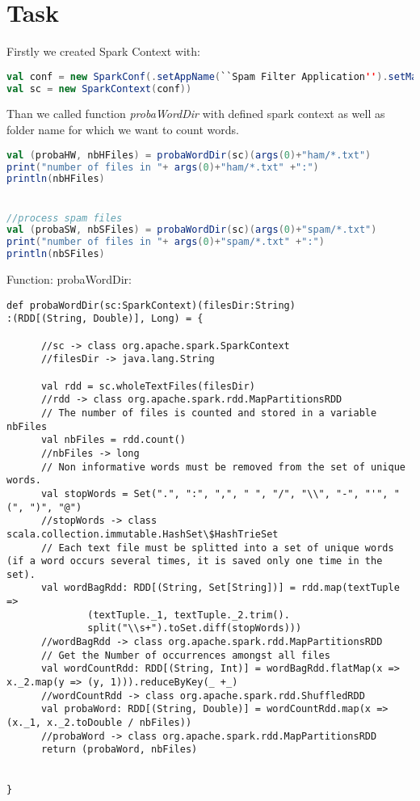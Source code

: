 \documentclass[paper=a4, fontsize=11pt]{scrartcl}
\numberwithin{equation}{section}		%
\numberwithin{figure}{section}			%
\numberwithin{table}{section}				%
\begin{document}
\section{Task}
Firstly we created Spark Context with:
\begin{lstlisting}[language=scala]
val conf = new SparkConf(.setAppName(``Spam Filter Application'').setMaster(``local'')
val sc = new SparkContext(conf))
\end{lstlisting}
Than we called function \textit{probaWordDir} with defined spark context as well as folder name for which we want to count words.
\begin{lstlisting}[language=scala]
val (probaHW, nbHFiles) = probaWordDir(sc)(args(0)+"ham/*.txt")
print("number of files in "+ args(0)+"ham/*.txt" +":")
println(nbHFiles)


//process spam files
val (probaSW, nbSFiles) = probaWordDir(sc)(args(0)+"spam/*.txt")
print("number of files in "+ args(0)+"spam/*.txt" +":")
println(nbSFiles)
\end{lstlisting}

Function: probaWordDir:
\begin{lstlisting}
def probaWordDir(sc:SparkContext)(filesDir:String)
:(RDD[(String, Double)], Long) = {

      //sc -> class org.apache.spark.SparkContext
      //filesDir -> java.lang.String

      val rdd = sc.wholeTextFiles(filesDir)
      //rdd -> class org.apache.spark.rdd.MapPartitionsRDD
      // The number of files is counted and stored in a variable nbFiles
      val nbFiles = rdd.count()
      //nbFiles -> long
      // Non informative words must be removed from the set of unique words.
      val stopWords = Set(".", ":", ",", " ", "/", "\\", "-", "'", "(", ")", "@")
      //stopWords -> class scala.collection.immutable.HashSet\$HashTrieSet
      // Each text file must be splitted into a set of unique words (if a word occurs several times, it is saved only one time in the set).
      val wordBagRdd: RDD[(String, Set[String])] = rdd.map(textTuple =>
              (textTuple._1, textTuple._2.trim().
              split("\\s+").toSet.diff(stopWords)))
      //wordBagRdd -> class org.apache.spark.rdd.MapPartitionsRDD
      // Get the Number of occurrences amongst all files
      val wordCountRdd: RDD[(String, Int)] = wordBagRdd.flatMap(x => x._2.map(y => (y, 1))).reduceByKey(_ +_)
      //wordCountRdd -> class org.apache.spark.rdd.ShuffledRDD
      val probaWord: RDD[(String, Double)] = wordCountRdd.map(x => (x._1, x._2.toDouble / nbFiles))
      //probaWord -> class org.apache.spark.rdd.MapPartitionsRDD
      return (probaWord, nbFiles)


}
\end{lstlisting}
\end{document}
